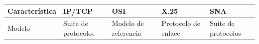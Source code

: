 \newpage
\begingroup
\renewcommand*{\arraystretch}{1.5}
\small %
\begin{longtable}{|>{\raggedright\arraybackslash}m{2.4cm}|>{\raggedright\arraybackslash}m{2.8cm}|>{\raggedright\arraybackslash}m{2.8cm}|>{\raggedright\arraybackslash}m{2.8cm}|>{\raggedright\arraybackslash}m{2.8cm}|}
      \hline
      \textbf{Característica} & \textbf{IP/TCP}                                                                                                                                                                        & \textbf{OSI}                                                                                                                                                                                                                                         & \textbf{X.25}                                                                                                                                                                                                                                                                                                                                                                    & \textbf{SNA}                                                                                                                                                                                                                                                                           \\ \hline
      Modelo                  & Suite de protocolos                                                                                                                                                                    & Modelo de referencia                                                                                                                                                                                                                                 & Protocolo de enlace                                                                                                                                                                                                                                                                                                                                                              & Suite de protocolos                                                                                                                                                                                                                                                                    \\ \hline

\end{longtable}
